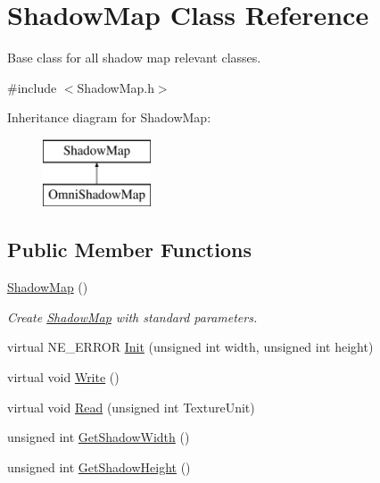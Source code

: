 \hypertarget{class_shadow_map}{}\section{Shadow\+Map Class Reference}
\label{class_shadow_map}


Base class for all shadow map relevant classes.  




{\ttfamily \#include $<$Shadow\+Map.\+h$>$}

Inheritance diagram for Shadow\+Map\+:\begin{figure}[H]
\begin{center}
\leavevmode
\includegraphics[height=2.000000cm]{class_shadow_map}
\end{center}
\end{figure}
\subsection*{Public Member Functions}
\begin{DoxyCompactItemize}
\item 
\mbox{\label{class_shadow_map_ab6fd44eb98770e85a2fafc27437169b1}} 
\mbox{\hyperlink{class_shadow_map_ab6fd44eb98770e85a2fafc27437169b1}{Shadow\+Map}} ()
\begin{DoxyCompactList}\small\item\em Create \mbox{\hyperlink{class_shadow_map}{Shadow\+Map}} with standard parameters. \end{DoxyCompactList}\item 
virtual N\+E\+\_\+\+E\+R\+R\+OR \mbox{\hyperlink{class_shadow_map_ad622c961f2cdc0ba2cbe24a759eb690b}{Init}} (unsigned int width, unsigned int height)
\item 
virtual void \mbox{\hyperlink{class_shadow_map_abfaac01d19680e016042dacee5a5910e}{Write}} ()
\item 
virtual void \mbox{\hyperlink{class_shadow_map_a6b48e98aeab56d0c9bf4c2ac4beeb3db}{Read}} (unsigned int Texture\+Unit)
\item 
unsigned int \mbox{\hyperlink{class_shadow_map_aebc34fd1ba0da1b4672d1dd0036771c2}{Get\+Shadow\+Width}} ()
\item 
unsigned int \mbox{\hyperlink{class_shadow_map_a04cb4ac6a4075d859e96ee3d55980a01}{Get\+Shadow\+Height}} ()
\end{DoxyCompactItemize}
